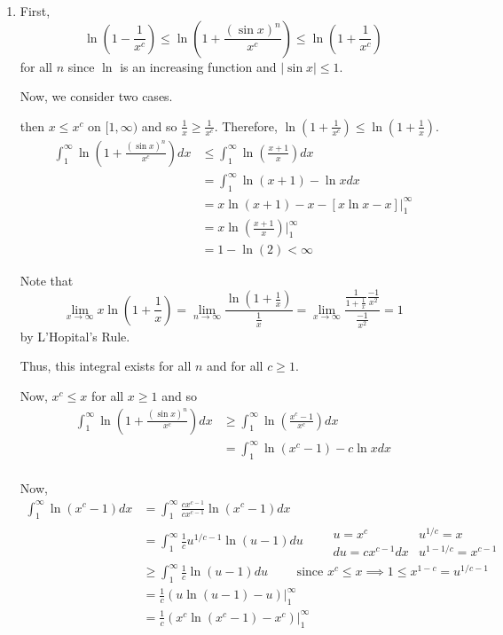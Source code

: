 \documentclass[12pt]{Homework}
\begin{document}
\begin{solution}$\,$
\begin{enumerate}[label=(\alph*)]
    \item First, $$\ln\left(1-\frac{1}{x^c}\right)\le \ln\left(1+\frac{(\sin x)^n}{x^c}\right)\le\ln\left(1+\frac{1}{x^c}\right)$$ for all $n$ since $\ln$ is an increasing function and $|\sin x|\le 1$.
    
    Now, we consider two cases. 
    
     then $x\le x^c$ on $[1,\infty)$ and so $\frac{1}{x}\ge\frac{1}{x^c}$. Therefore, $\ln\left(1+\frac{1}{x^c}\right)\le\ln\left(1+\frac{1}{x}\right)$. \begin{align*}
        \int_1^\infty\ln\left(1+\frac{(\sin x)^n}{x^c}\right)dx&\le\int_1^\infty\ln\left(\frac{x+1}{x}\right)dx\\
        &=\int_1^\infty\ln(x+1)-\ln xdx\\
        &=x\ln(x+1)-x-[x\ln x-x]\bigg|_1^\infty\\
        &=x\ln\left(\frac{x+1}{x}\right)\bigg|_1^\infty\\
        &=1-\ln(2)<\infty
    \end{align*}
    
    Note that $$\lim_{x\to\infty}x\ln\left(1+\frac{1}{x}\right)=\lim_{n\to\infty}\frac{\ln\left(1+\frac{1}{x}\right)}{\frac{1}{x}}=\lim_{x\to\infty}\frac{\frac{1}{1+\frac{1}{x}}\frac{-1}{x^2}}{\frac{-1}{x^2}}=1$$ by L'Hopital's Rule.
    
    Thus, this integral exists for all $n$ and for all $c\ge1$.
    
     Now, $x^c\le x$ for all $x\ge 1$ and so \begin{align*}
        \int_1^\infty\ln\left(1+\frac{(\sin x)^n}{x^c}\right)dx&\ge\int_1^\infty\ln\left(\frac{x^c-1}{x^c}\right)dx\\
        &=\int_1^\infty\ln(x^c-1)-c\ln xdx\\
    \end{align*}
    
    Now, \begin{align*}
        \int_1^\infty\ln(x^c-1)dx&=\int_1^\infty\frac{cx^{c-1}}{cx^{c-1}}\ln(x^c-1)dx\\
        &=\int_1^\infty \frac{1}{c}u^{1/c-1}\ln(u-1)du\qquad \begin{matrix}
    u=x^c &  u^{1/c}=x\\
    du=cx^{c-1}dx & u^{1-1/c}=x^{c-1} 
\end{matrix}\\
        &\ge \int_1^\infty\frac{1}{c}\ln(u-1)du\qquad\text{ since }x^c\le x\implies 1\le x^{1-c}=u^{1/c-1}\\
        &=\frac{1}{c}(u\ln(u-1)-u)\bigg|_1^\infty\\
        &=\frac{1}{c}(x^c\ln(x^c-1)-x^c)\bigg|_1^\infty
\end{align*}


\end{enumerate}
\end{solution}
\end{document}
